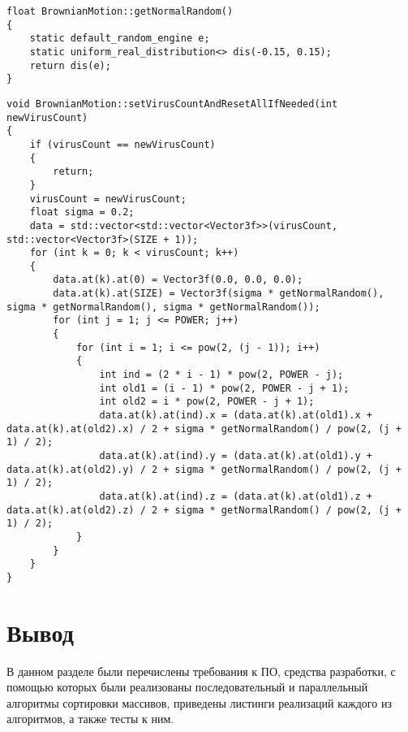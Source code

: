 \begin{lstlisting}[label=code:getNormal,caption=Реализация вспомогательной функции вычисления распределенной нормально случайной величины]
float BrownianMotion::getNormalRandom()
{
	static default_random_engine e;
	static uniform_real_distribution<> dis(-0.15, 0.15);
	return dis(e);
}
\end{lstlisting}

\newpage

\begin{lstlisting}[label=code:brown,caption=Реализация расчета изменения координат центров частиц (броуновское движение)]
void BrownianMotion::setVirusCountAndResetAllIfNeeded(int newVirusCount)
{
	if (virusCount == newVirusCount)
	{
		return;
	}
	virusCount = newVirusCount;
	float sigma = 0.2;
	data = std::vector<std::vector<Vector3f>>(virusCount, std::vector<Vector3f>(SIZE + 1));
	for (int k = 0; k < virusCount; k++)
	{
		data.at(k).at(0) = Vector3f(0.0, 0.0, 0.0);
		data.at(k).at(SIZE) = Vector3f(sigma * getNormalRandom(), sigma * getNormalRandom(), sigma * getNormalRandom());
		for (int j = 1; j <= POWER; j++)
		{
			for (int i = 1; i <= pow(2, (j - 1)); i++)
			{
				int ind = (2 * i - 1) * pow(2, POWER - j);
				int old1 = (i - 1) * pow(2, POWER - j + 1);
				int old2 = i * pow(2, POWER - j + 1);
				data.at(k).at(ind).x = (data.at(k).at(old1).x + data.at(k).at(old2).x) / 2 + sigma * getNormalRandom() / pow(2, (j + 1) / 2);
				data.at(k).at(ind).y = (data.at(k).at(old1).y + data.at(k).at(old2).y) / 2 + sigma * getNormalRandom() / pow(2, (j + 1) / 2);
				data.at(k).at(ind).z = (data.at(k).at(old1).z + data.at(k).at(old2).z) / 2 + sigma * getNormalRandom() / pow(2, (j + 1) / 2);
			}
		}
	}
}
\end{lstlisting}

\section*{Вывод}
В данном разделе были перечислены требования к ПО, средства разработки, с помощью которых были реализованы последовательный и параллельный алгоритмы сортировки массивов, приведены листинги реализаций каждого из алгоритмов, а также тесты к ним.



